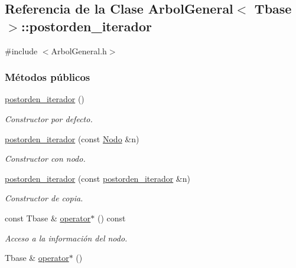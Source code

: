 \hypertarget{classArbolGeneral_1_1postorden__iterador}{\subsection{Referencia de la Clase Arbol\-General$<$ Tbase $>$\-:\-:postorden\-\_\-iterador}
\label{classArbolGeneral_1_1postorden__iterador}
}


{\ttfamily \#include $<$Arbol\-General.\-h$>$}

\subsubsection*{Métodos públicos}
\begin{DoxyCompactItemize}
\item 
\hyperlink{classArbolGeneral_1_1postorden__iterador_a2ac2dbbaf71087cf7d5964b45b4bca1e}{postorden\-\_\-iterador} ()
\begin{DoxyCompactList}\small\item\em Constructor por defecto. \end{DoxyCompactList}\item 
\hyperlink{classArbolGeneral_1_1postorden__iterador_a40c1929529a5d1063e97c07a73ecb043}{postorden\-\_\-iterador} (const \hyperlink{classArbolGeneral_a12cc1b74a9095d89bc7334290d332f7a}{Nodo} \&n)
\begin{DoxyCompactList}\small\item\em Constructor con nodo. \end{DoxyCompactList}\item 
\hyperlink{classArbolGeneral_1_1postorden__iterador_a07bc1d0276eb14be207144f0a69745d3}{postorden\-\_\-iterador} (const \hyperlink{classArbolGeneral_1_1postorden__iterador}{postorden\-\_\-iterador} \&n)
\begin{DoxyCompactList}\small\item\em Constructor de copia. \end{DoxyCompactList}\item 
const Tbase \& \hyperlink{classArbolGeneral_1_1postorden__iterador_a7416472d2c6f1ecf02262e79887f38ee}{operator$\ast$} () const 
\begin{DoxyCompactList}\small\item\em Acceso a la información del nodo. \end{DoxyCompactList}\item 
Tbase \& \hyperlink{classArbolGeneral_1_1postorden__iterador_af0f0fcc363dd30b5b0d102c1b60817c3}{operator$\ast$} ()

\end{DoxyCompactItemize}
